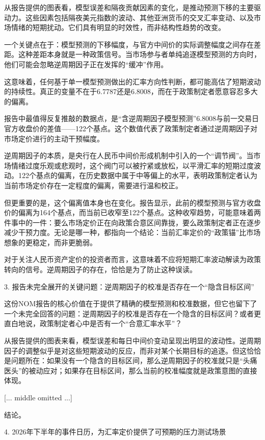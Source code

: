 \documentclass[11pt]{ctexart}
\begin{document}
从报告提供的图表看，模型误差和隔夜贡献因素的变化，是推动预测下移的主要驱动力。这些因素包括隔夜美元指数的波动、其他亚洲货币的交叉汇率变动、以及市场情绪的短期扰动。它们具有明显的时效性，而非结构性趋势的改变。

一个关键点在于：模型预测的下移幅度，与官方中间价的实际调整幅度之间存在差距。这种差距本身就是一种政策信号。当市场参与者单纯追逐模型预测的方向时，他们可能会忽略逆周期因子正在发挥的“缓冲”作用。

这意味着，任何基于单一模型预测做出的汇率方向性判断，都可能高估了短期波动的持续性。真正的变量不在于6.7787还是6.8008，而在于政策制定者愿意容忍多大的偏离。

报告中最值得反复推敲的数据点，是“含逆周期因子模型预测”6.8008与前一交易日官方收盘价的差值——122个基点。这个数值代表了政策制定者通过逆周期因子对市场定价进行的主动干预幅度。

逆周期因子的本质，是央行在人民币中间价形成机制中引入的一个“调节阀”。当市场情绪过度乐观或悲观时，这个阀门可以被拧紧或放松，以平滑汇率的短期过度波动。122个基点的偏离，在历史数据中属于中等偏上的水平，表明政策制定者认为当前市场定价存在一定程度的偏离，需要进行温和校正。

但更重要的是，这个偏离值本身也在变化。报告显示，此前的模型预测与官方收盘价的偏离为164个基点，而当前已收窄至122个基点。这种收窄趋势，可能意味着两件事中的一件：要么市场定价正在向政策合意区间靠拢，要么政策制定者正在逐步减少干预力度。无论是哪一种，都指向一个结论：当前汇率定价的“政策锚”比市场想象的更稳定，而非更脆弱。

对于关注人民币资产定价的投资者而言，这意味着不应将短期汇率波动解读为政策转向的信号。逆周期因子的存在，恰恰是为了防止这种误读。

3. 报告未完全展开的关键问题：逆周期因子的校准是否存在一个“隐含目标区间”

这份NOM报告的核心价值在于提供了精确的模型预测和校准数据，但它也留下了一个未完全回答的问题：逆周期因子的校准是否存在一个隐含的目标区间？或者更直白地说，政策制定者心中是否有一个“合意汇率水平”？

从报告提供的图表来看，模型误差和每日中间价变动呈现出明显的波动性。逆周期因子的调整似乎是对这些短期波动的反应，而非对某个长期目标的追逐。但这恰恰是问题所在：如果没有一个隐含的目标区间，那么逆周期因子的校准就只是“头痛医头”的被动应对；如果存在目标区间，那么当前的校准幅度就是政策意图的直接体现。



[... middle omitted ...]

结论。

4. 2026年下半年的事件日历，为汇率定价提供了可预期的压力测试场景
\end{document}
